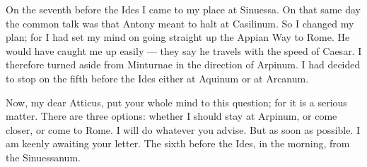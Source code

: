 

 On the seventh before the Ides I came to my place at Sinuessa. On that same day the common talk was that Antony meant to halt at Casilinum. So I changed my plan; for I had set my mind on going straight up the Appian Way to Rome. He would have caught me up easily --- they say he travels with the speed of Caesar. I therefore turned aside from Minturnae in the direction of Arpinum. I had decided to stop on the fifth before the Ides either at Aquinum or at Arcanum.

 Now, my dear Atticus, put your whole mind to this question; for it is a serious matter. There are three options: whether I should stay at Arpinum, or come closer, or come to Rome. I will do whatever you advise. But as soon as possible. I am keenly awaiting your letter. The sixth before the Ides, in the morning, from the Sinuessanum.
